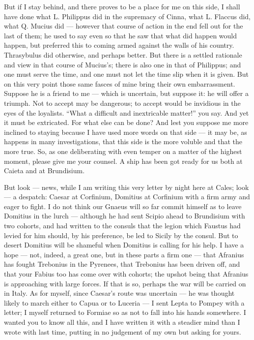  But if I stay behind, and there proves to be a place for me on this side, I shall have done what L. Philippus did in the supremacy of Cinna, what L. Flaccus did, what Q. Mucius did --- however that course of action in the end fell out for the last of them; he used to say even so that he saw that what did happen would happen, but preferred this to coming armed against the walls of his country. Thrasybulus did otherwise, and perhaps better. But there is a settled rationale and view in that course of Mucius's; there is also one in that of Philippus; and one must serve the time, and one must not let the time slip when it is given. But on this very point those same fasces of mine bring their own embarrassment. Suppose he is a friend to me --- which is uncertain, but suppose it: he will offer a triumph. Not to accept may be dangerous; to accept would be invidious in the eyes of the loyalists. ``What a difficult and inextricable matter!'' you say. And yet it must be extricated. For what else can be done? And lest you suppose me more inclined to staying because I have used more words on that side --- it may be, as happens in many investigations, that this side is the more voluble and that the more true. So, as one deliberating with even temper on a matter of the highest moment, please give me your counsel. A ship has been got ready for us both at Caieta and at Brundisium.

 But look --- news, while I am writing this very letter by night here at Cales; look --- a despatch: Caesar at Corfinium, Domitius at Corfinium with a firm army and eager to fight. I do not think our Gnaeus will so far commit himself as to leave Domitius in the lurch --- although he had sent Scipio ahead to Brundisium with two cohorts, and had written to the consuls that the legion which Faustus had levied for him should, by his preference, be led to Sicily by the consul. But to desert Domitius will be shameful when Domitius is calling for his help. I have a hope --- not, indeed, a great one, but in these parts a firm one --- that Afranius has fought Trebonius in the Pyrenees, that Trebonius has been driven off, and that your Fabius too has come over with cohorts; the upshot being that Afranius is approaching with large forces. If that is so, perhaps the war will be carried on in Italy. As for myself, since Caesar's route was uncertain --- he was thought likely to march either to Capua or to Luceria --- I sent Lepta to Pompey with a letter; I myself returned to Formiae so as not to fall into his hands somewhere. I wanted you to know all this, and I have written it with a steadier mind than I wrote with last time, putting in no judgement of my own but asking for yours.
